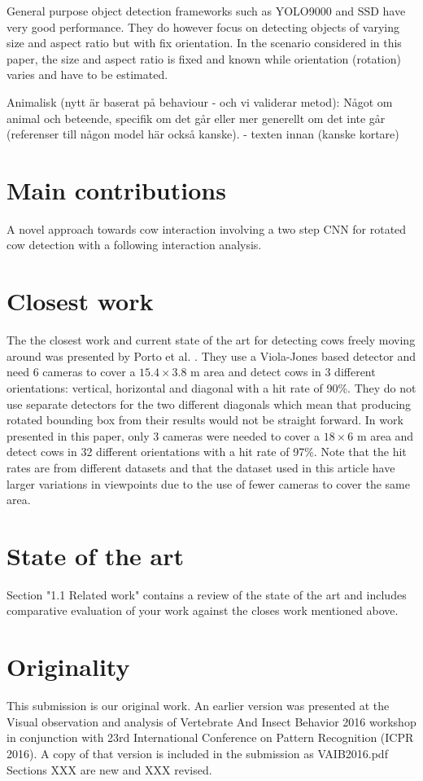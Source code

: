 \documentclass[10pt,a4paper]{article}
\begin{document}
General purpose object detection frameworks such as YOLO9000 \cite{FIXME} and SSD \cite{FXIME} have very good performance.
 They do however focus on detecting objects of varying size and aspect ratio but with fix orientation. 
 In the scenario considered in this paper, 
 the size and aspect ratio is fixed and known while orientation (rotation) 
 varies and have to be estimated.

Animalisk (nytt är baserat på behaviour - och vi validerar metod):
Något om animal och beteende, specifik om det går eller mer generellt om det inte går (referenser till någon model här också kanske).
- texten innan (kanske kortare)


\section{Main contributions}
A novel approach towards cow interaction involving a two step CNN for rotated cow detection with a following interaction analysis.

\section{Closest work}
The the closest work and current state of the art for detecting cows freely moving around was presented by Porto et al. \cite{porto2015automatic}. They use a Viola-Jones based detector and need 
6 cameras to cover a $15.4 \times 3.8$ m area and detect cows in 3 different orientations: vertical, horizontal and diagonal with a hit rate of 90\%. They do not use separate detectors for the two different diagonals which mean that producing rotated bounding box from their results would not be straight forward. In work presented in this paper, only 3 cameras were needed to cover a $18 \times 6$ m area and detect cows in 32 different orientations with a hit rate of 97\%. Note that the hit rates are from different datasets and that the dataset used in this article have larger variations in viewpoints due to the use of fewer cameras to cover the same area.

\section{State of the art}
Section "1.1 Related work" contains a review of the state of the art and includes comparative evaluation of your work against the closes work mentioned above.

\section{Originality}
This submission is our original work. An earlier version was presented at the Visual observation and analysis of Vertebrate And Insect Behavior 2016 workshop  in conjunction with 23rd International Conference on Pattern Recognition (ICPR 2016). A copy of that version is included in the submission as VAIB2016.pdf Sections XXX are new and XXX revised.


{\parindent0pt
\parskip8pt

}
\end{document}
